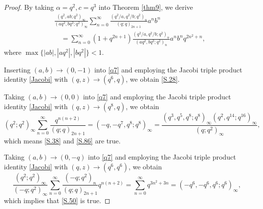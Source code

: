 \documentclass[reqno,12pt]{amsart}
\theoremstyle{remark}
\numberwithin{equation}{section}
\begin{document}
\begin{proof}
By taking $\alpha=q^2,c=q^3$ into Theorem \ref{thm9}, we derive 
\begin{align}
&\frac{\left(q^2,ab;q^2\right)_{\infty}}
{\left(aq^2,bq^2;q^2\right)_{\infty}}\sum_{n=0}^{\infty}
\frac{\left(q^2/a,q^2/b;q^2\right)_{n}}
{\left(q;q\right)_{2n+1}}a^nb^n\nonumber\\
&\quad=\sum_{n=0}^{\infty}\left(1+q^{2n+1}\right)
\frac{\left(q^2/a,q^2/b;q^2\right)_{n}}
{\left(aq^2,bq^2;q^2\right)_n}
a^nb^nq^{2n^2+n},\label{q7}
\end{align}
where $\max\{|ab|,|aq^2|,|bq^2|\}<1$.



Inserting $\left(a,b\right)\to\left(0,-1\right)$ into \eqref{q7} and employing the Jacobi triple product identity \eqref{Jacobi} with $\left(q,z\right)\to\left(q^6,q\right)$, we obtain \eqref{S.28}.


Taking $\left(a,b\right)\to\left(0,0\right)$ into \eqref{q7} and employing the Jacobi triple product identity \eqref{Jacobi} with $\left(q,z\right)\to\left(q^8,q\right)$, we obtain
\begin{equation*}
\left(q^2;q^2\right)_{\infty}
\sum_{n=0}^{\infty}\frac{q^{n\left(n+2\right)}}{\left(q;q\right)_{2n+1}}
=\left(-q,-q^7,q^8;q^8\right)_{\infty}
=\frac{\left(q^3,q^5,q^8;q^8\right)_{\infty}
\left(q^2,q^{14};q^{16}\right)_{\infty}}
{\left(q;q^2\right)_{\infty}},
\end{equation*}
which means \eqref{S.38} and \eqref{S.86} are true.


Taking $\left(a,b\right)\to\left(0,-q\right)$ into \eqref{q7} and employing the Jacobi triple product identity \eqref{Jacobi} with $\left(q,z\right)\to\left(q^6,q^6\right)$, we obtain
\begin{equation*}
\frac{\left(q^2;q^2\right)_{\infty}}{\left(-q;q^2\right)_{\infty}}
\sum_{n=0}^{\infty}\frac{\left(-q;q^2\right)_{n}}{\left(q;q\right)_{2n+1}}
q^{n\left(n+2\right)}
=\sum_{n=0}^{\infty}q^{3n^2+3n}
=\left(-q^6,-q^6,q^{6};q^{6}\right)_{\infty},
\end{equation*}
which implies that \eqref{S.50} is true.
\end{proof}
\end{document}
